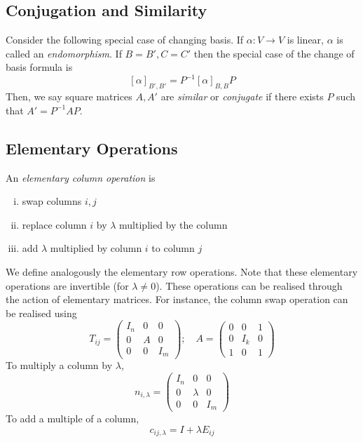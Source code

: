 \subsection{Conjugation and Similarity}
Consider the following special case of changing basis.
If \( \alpha \colon V \to V \) is linear, \( \alpha \) is called an \textit{endomorphism}.
If \( B = B', C = C' \) then the special case of the change of basis formula is
\[
	[\alpha]_{B',B'} = P^{-1} [\alpha]_{B,B} P
\]
Then, we say square matrices \( A, A' \) are \textit{similar} or \textit{conjugate} if there exists \( P \) such that \( A' = P^{-1} A P \).

\subsection{Elementary Operations}
\begin{definition}
	An \textit{elementary column operation} is
	\begin{enumerate}[(i)]
		\item swap columns \( i, j \)
		\item replace column \( i \) by \( \lambda \) multiplied by the column
		\item add \( \lambda \) multiplied by column \( i \) to column \( j \)
	\end{enumerate}
\end{definition}
We define analogously the elementary row operations.
Note that these elementary operations are invertible (for \( \lambda \neq 0 \)).
These operations can be realised through the action of elementary matrices.
For instance, the column swap operation can be realised using
\[
	T_{ij} = \begin{pmatrix}
		I_n & 0 & 0   \\
		0   & A & 0   \\
		0   & 0 & I_m
	\end{pmatrix};\quad A = \begin{pmatrix}
		0 & 0   & 1 \\
		0 & I_k & 0 \\
		1 & 0   & 1
	\end{pmatrix}
\]
To multiply a column by \( \lambda \),
\[
	n_{i,\lambda} = \begin{pmatrix}
		I_n & 0       & 0   \\
		0   & \lambda & 0   \\
		0   & 0       & I_m
	\end{pmatrix}
\]
To add a multiple of a column,
\[
	c_{ij,\lambda} = I + \lambda E_{ij}
\]
